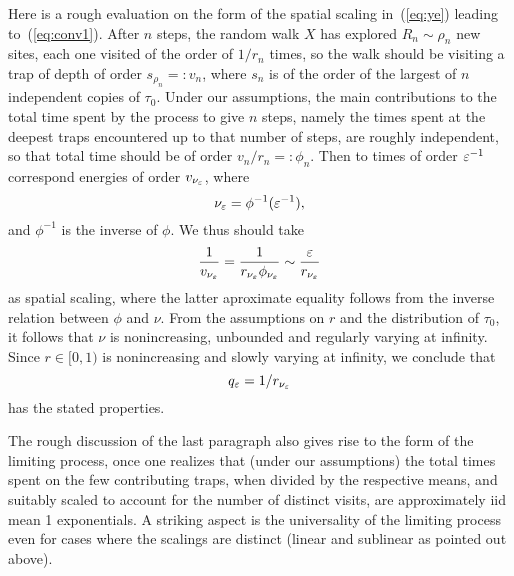 Here is a rough evaluation on the form of the spatial scaling in~(\ref{eq:ye}) leading to~(\ref{eq:conv1}). 
After $n$ steps, the random walk $X$ has explored $R_n\sim\rho_n$ new sites, each
one visited of the order of $1/r_n$ times, so the walk should be visiting a trap of depth of order $s_{\rho_n}=:v_n$, 
where $s_n$ is of the order of the largest of $n$ independent copies of $\tau_0$. Under our assumptions, the main 
contributions to the total time spent by the process to give $n$ steps, namely the times spent at the deepest 
traps encountered up to that number of steps, are roughly independent, so that total time should be of order $v_n/r_n=:\phi_n$. 
Then to times of order $\varepsilon^{-1}$ correspond energies of order $v_{\nu_\varepsilon}$, where
\begin{equation}\label{eq:nue}
\nu_\eps=\phi^{-1}(\eps^{-1}),
\end{equation}
and $\phi^{-1}$ is the inverse of $\phi$.
We thus should take
\begin{equation}\label{eq:ae1}
\frac1{v_{\nu_\eps}}=\frac1{r_{\nu_\eps}\phi_{\nu_\eps}}\sim\frac{\eps}{r_{\nu_\eps}}
\end{equation} 
as spatial scaling, where the latter aproximate equality follows from the inverse relation between $\phi$ and $\nu$.
From the assumptions on $r$ and the distribution of $\tau_0$, it follows that $\nu$ is nonincreasing, unbounded and regularly
varying at infinity. Since $r\in[0,1)$ is nonincreasing and slowly varying at infinity, we conclude that 
\begin{equation}\label{eq:ae2}
q_\eps=1/r_{\nu_\eps} 
\end{equation} 
has the stated properties.


The rough discussion of the last paragraph also gives rise to the form of the limiting process, once one realizes 
that (under our assumptions) the total times spent on the few contributing traps, when divided by the respective
means, and suitably scaled to account for the number of distinct visits, are approximately iid mean 1 exponentials.
A striking aspect is the universality of the limiting process even for cases where the scalings are distinct
(linear and sublinear as pointed out above).


